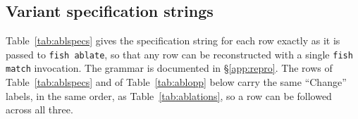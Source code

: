 \begin{center}
\end{center}

\subsection{Variant specification strings}
\label{app:abl-specs}

Table~\ref{tab:ablspecs} gives the specification string for each row exactly as
it is passed to \texttt{fish ablate}, so that any row can be reconstructed with
a single \texttt{fish match} invocation. The grammar is documented in
\S\ref{app:repro}. The rows of Table~\ref{tab:ablspecs} and of
Table~\ref{tab:ablopp} below carry the same ``Change'' labels, in the same
order, as Table~\ref{tab:ablations}, so a row can be followed across all three.

